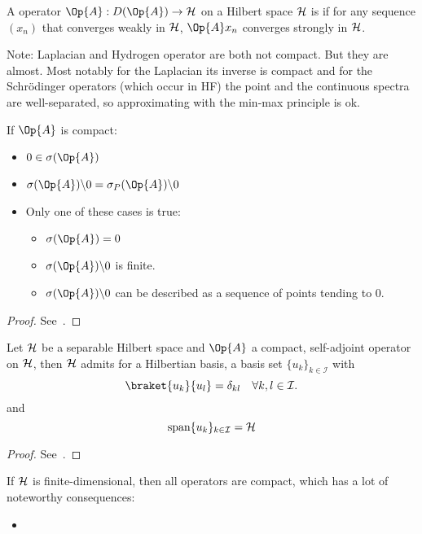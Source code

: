 \begin{defn}
	A operator $\Op{A} : D(\Op{A}) \to \hilbert$ on a Hilbert space $\mathcal{H}$
	is 
	if for any sequence $(x_n)$ that converges weakly in $\mathcal{H}$,
	$\Op{A} x_n$ converges strongly in $\mathcal{H}$.
\end{defn}

Note: Laplacian and Hydrogen operator are both not compact.
But they are almost.
Most notably for the Laplacian its inverse is compact
and for the Schrödinger operators (which occur in HF)
the point and the continuous spectra are well-separated,
so approximating with the min-max principle is ok.


\begin{prop}
	If $\Op{A}$ is compact:
	\begin{itemize}
		\item $0 \in \sigma(\Op{A})$
		\item $\sigma(\Op{A}) \backslash {0} = \sigma_P(\Op{A}) \backslash {0}$
		\item Only one of these cases is true:
			\begin{itemize}
				\item $\sigma(\Op{A}) = {0}$
				\item $\sigma(\Op{A}) \backslash {0}$ is finite.
				\item $\sigma(\Op{A}) \backslash {0}$ can be described
					as a sequence of points tending to $0$.
			\end{itemize}
	\end{itemize}
	\begin{proof}
		See~\cite[p. 56]{Helffer2013}.
	\end{proof}
\end{prop}

\begin{prop}
	Let $\mathcal{H}$ be a separable Hilbert space and $\Op{A}$ a compact,
	self-adjoint operator on $\mathcal{H}$,
	then $\mathcal{H}$ admits for a Hilbertian basis,
	\ie a basis set $\{ u_k \}_{k \in \mathcal{I}}$ with
	\[ \braket{u_k}{u_l} = \delta_{kl} \quad \forall k,l \in \mathcal{I}. \]
	and
	\[ \text{span} \{ u_k \}_{k \in \mathcal{I}} = \mathcal{H} \]
	\begin{proof}
		See~\cite[p. 60]{Helffer2013}.
	\end{proof}
\end{prop}

\begin{rem}
If $\mathcal{H}$ is finite-dimensional, then all operators are compact,
which has a lot of noteworthy consequences:
\begin{itemize}
	\item 
\end{itemize}
\end{rem}

